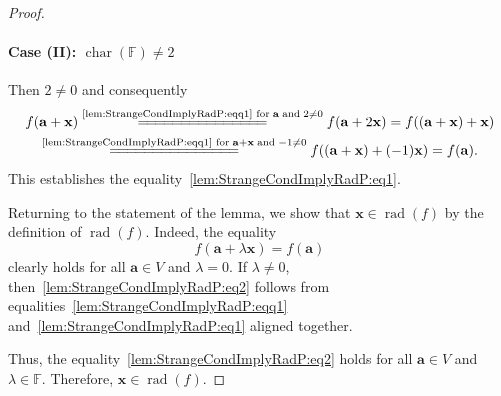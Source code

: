\documentclass{elsarticle}
\DeclareMathOperator{\Char}{char}
\DeclareMathOperator{\rad}{rad}
\def\F{{\mathbb F}}
\theoremstyle{definition}
\numberwithin{equation}{section}
\begin{document}
\begin{proof}
\paragraph{Case (II): $\Char(\F) \neq 2$} Then $2 \neq 0$ and consequently
\begin{multline*}
f(\mathbf a + \mathbf x) \overset{\scriptsize \mbox{\eqref{lem:StrangeCondImplyRadP:eqq1} for}\;\mathbf a \;\mbox{and}\; 2 \neq 0}{=\joinrel=\joinrel=\joinrel=\joinrel=\joinrel=\joinrel=\joinrel=\joinrel=\joinrel=\joinrel=\joinrel=\joinrel=\joinrel=\joinrel=} f(\mathbf a + 2\mathbf x) = f(\left(\mathbf a + \mathbf x\right) + \mathbf x)\\
 \overset{\scriptsize \mbox{\eqref{lem:StrangeCondImplyRadP:eqq1} for}\;\mathbf a + \mathbf x \;\mbox{and}\; -1 \neq 0}{=\joinrel=\joinrel=\joinrel=\joinrel=\joinrel=\joinrel=\joinrel=\joinrel=\joinrel=\joinrel=\joinrel=\joinrel=\joinrel=\joinrel=} f(\left(\mathbf a + \mathbf x\right) + (-1)\mathbf x) = f(\mathbf a).
\end{multline*}
This establishes the equality~\eqref{lem:StrangeCondImplyRadP:eq1}.\bigskip

Returning to the statement of the lemma, we show that $\mathbf x \in \rad(f)$ by the definition of $\rad(f)$. Indeed, the equality
\begin{equation}\label{lem:StrangeCondImplyRadP:eq2}
f(\mathbf a + \lambda\mathbf x) = f(\mathbf a)
\end{equation}
clearly holds for all $\mathbf a \in V$ and $\lambda = 0$. If $\lambda \neq 0$, then~\eqref{lem:StrangeCondImplyRadP:eq2} follows from equalities~\eqref{lem:StrangeCondImplyRadP:eqq1} and~\eqref{lem:StrangeCondImplyRadP:eq1} aligned together.

Thus, the equality~\eqref{lem:StrangeCondImplyRadP:eq2} holds for all $\mathbf a \in V$ and $\lambda \in \F$. Therefore, $\mathbf x \in \rad(f)$.
\end{proof}
\end{document}
